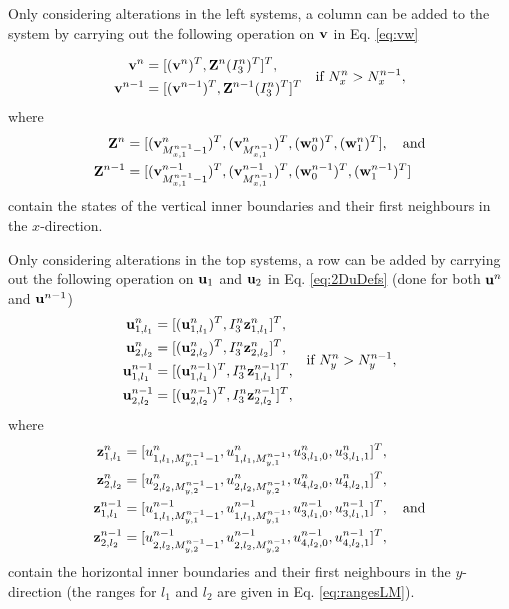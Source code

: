 \documentclass[fleqn]{jaes}
\begin{document}
Only considering alterations in the left systems, a column can be added to the system by carrying out the following operation on $\mathbf{v}$ in Eq. \eqref{eq:vw}

\begin{equation}
\begin{aligned}
   \v^n &= [(\v^n)^T, \Z^n(I_3^n)^T]^T,\\
   \v^{n-1} &= [(\v^{n-1})^T, \Z^{n-1}(I_3^n)^T]^T
   \end{aligned} \quad \text{if } N_x^n > N_x^{n-1},
\end{equation}
where
\begin{align*}
\Z^n &= [(\v_{M_{x,1}^{n-1}-1}^n)^T, (\v_{M_{x,1}^{n-1}}^n)^T, (\w_{0}^n)^T, (\w_{1}^n)^T], \quad \text{and}\\
\Z^{n-1} &= [(\v_{M_{x,1}^{n-1}-1}^{n-1})^T, (\v_{M_{x,1}^{n-1}}^{n-1})^T, (\w_{0}^{n-1})^T, (\w_{1}^{n-1})^T]
\end{align*}
contain the states of the vertical inner boundaries and their first neighbours in the $x$-direction. 

Only considering alterations in the top systems, a row can be added by carrying out the following operation on $\mathbf{u}_1$ and $\mathbf{u}_2$ in Eq. \eqref{eq:2DuDefs} (done for both $\mathbf{u}^n$ and $\mathbf{u}^{n-1}$) 
\begin{equation*}
    \begin{aligned}
        \u_{1,l_1}^n &= [(\u_{1,l_1}^n)^T, I_3^n \z_{1, l_1}^n]^T,\\
        \u_{2,l_2}^n &= [(\u_{2,l_2}^n)^T, I_3^n \z_{2, l_2}^n]^T,\\
        \u_{1,l_1}^{n-1} &= [(\u_{1,l_1}^{n-1})^T, I_3^n \z_{1, l_1}^{n-1}]^T,\\
        \u_{2,l_2}^{n-1} &= [(\u_{2,l_2}^{n-1})^T, I_3^n \z_{2, l_2}^{n-1}]^T,
    \end{aligned}\quad \text{if } N_y^n > N_y^{n-1},
\end{equation*}
where 
\begin{align*}
    \z_{1,l_1}^n &= [u_{1, l_1, M_{y,1}^{n-1}-1}^n, u_{1, l_1, M_{y,1}^{n-1}}^n, u_{3, l_1, 0}^n, u_{3, l_1, 1}^n]^T,\\
    \z_{2,l_2}^n &= [u_{2, l_2, M_{y,2}^{n-1}-1}^n, u_{2, l_2, M_{y,2}^{n-1}}^n, u_{4, l_2, 0}^n, u_{4, l_2, 1}^n]^T,\\
    \z_{1,l_1}^{n-1} &= [u_{1, l_1, M_{y,1}^{n-1}-1}^{n-1}, u_{1, l_1, M_{y,1}^{n-1}}^{n-1}, u_{3, l_1, 0}^{n-1}, u_{3, l_1, 1}^{n-1}]^T, \quad \text{and}\\
    \z_{2,l_2}^{n-1} &= [u_{2, l_2, M_{y,2}^{n-1}-1}^{n-1}, u_{2, l_2, M_{y,2}^{n-1}}^{n-1}, u_{4, l_2, 0}^{n-1}, u_{4, l_2, 1}^{n-1}]^T,
\end{align*}
contain the horizontal inner boundaries and their first neighbours in the $y$-direction (the ranges for $l_1$ and $l_2$ are given in Eq. \eqref{eq:rangesLM}).
\end{document}
